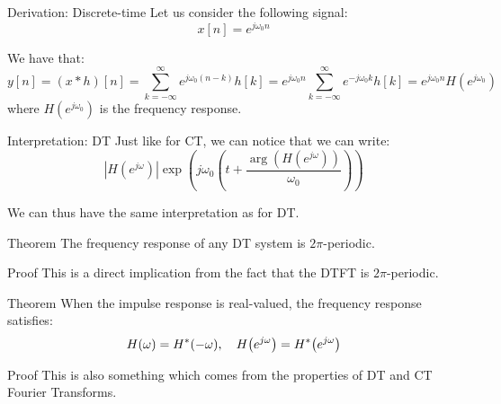 \documentclass[a4paper]{article}
\begin{document}
\begin{parag}{Derivation: Discrete-time}
    Let us consider the following signal: 
    \[x\left[n\right] = e^{j \omega_0 n}\]
    
    We have that: 
    \[y\left[n\right] = \left(x * h\right)\left[n\right] = \sum_{k=-\infty}^{\infty} e^{j \omega_0 \left(n-k\right)} h\left[k\right] = e^{j \omega_0 n} \sum_{k=-\infty}^{\infty} e^{-j \omega_0 k} h\left[k\right] = e^{j \omega_0 n} H\left(e^{j \omega_0}\right)\]
    where $H\left(e^{j \omega_0}\right)$ is the frequency response.
\end{parag}

\begin{parag}{Interpretation: DT}
    Just like for CT, we can notice that we can write: 
    \[\left|H\left(e^{j \omega}\right)\right| \exp\left(j \omega_0 \left(t + \frac{\arg\left(H\left(e^{j \omega}\right)\right)}{\omega_0}\right)\right)\]

    We can thus have the same interpretation as for DT.
\end{parag}

\begin{parag}{Theorem}
    The frequency response of any DT system is $2\pi$-periodic.

    \begin{subparag}{Proof}
        This is a direct implication from the fact that the DTFT is $2\pi$-periodic.
    \end{subparag}
\end{parag}

\begin{parag}{Theorem}
    When the impulse response is real-valued, the frequency response satisfies: 
    \[H\left(\omega\right) = H^*\left(-\omega\right), \mathspace H\left(e^{j\omega}\right) = H^*\left(e^{j\omega}\right)\]

    \begin{subparag}{Proof}
        This is also something which comes from the properties of DT and CT Fourier Transforms.
    \end{subparag}
    
\end{parag}
\end{document}
